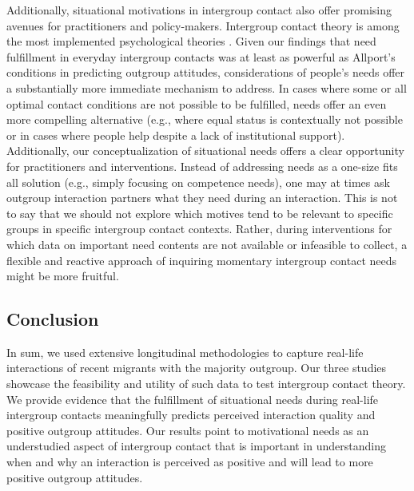 \documentclass[man, 12pt, a4paper, mask]{apa7}
\theoremstyle{break}
\theoremstyle{plain}
\begin{document}
Additionally, situational motivations in intergroup contact also offer promising avenues for practitioners and policy-makers. Intergroup contact theory is among the most implemented psychological theories \citep[e.g.,][]{Pettigrew2006, AlRamiah2012a, Reimer2021}. Given our findings that need fulfillment in everyday intergroup contacts was at least as powerful as Allport's conditions in predicting outgroup attitudes, considerations of people's needs offer a substantially more immediate mechanism to address. In cases where some or all optimal contact conditions are not possible to be fulfilled, needs offer an even more compelling alternative (e.g., where equal status is contextually not possible or in cases where people help despite a lack of institutional support). Additionally, our conceptualization of situational needs offers a clear opportunity for practitioners and interventions. Instead of addressing needs as a one-size fits all solution (e.g., simply focusing on competence needs), one may at times ask outgroup interaction partners what they need during an interaction. This is not to say that we should not explore which motives tend to be relevant to specific groups in specific intergroup contact contexts. Rather, during interventions for which data on important need contents are not available or infeasible to collect, a flexible and reactive approach of inquiring momentary intergroup contact needs might be more fruitful.


\subsection{Conclusion}
In sum, we used extensive longitudinal methodologies to capture real-life interactions of recent migrants with the majority outgroup. Our three studies showcase the feasibility and utility of such data to test intergroup contact theory. We provide evidence that the fulfillment of situational needs during real-life intergroup contacts meaningfully predicts perceived interaction quality and positive outgroup attitudes. Our results point to motivational needs as an understudied aspect of intergroup contact that is important in understanding when and why an interaction is perceived as positive and will lead to more positive outgroup attitudes.







\end{document}
